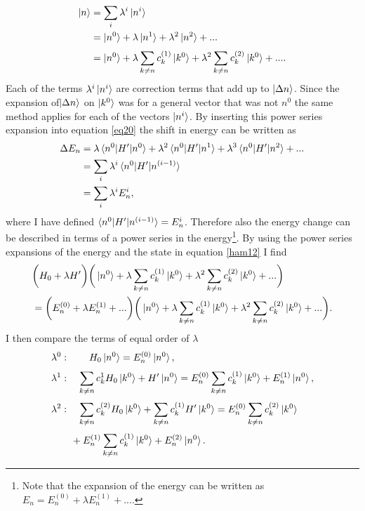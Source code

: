 \begin{equation}
	\begin{split}
		\ket{n}&=\sum_{i}\lambda^i\ket{n^i}\\
		&=\ket{n^0}+\lambda\ket{n^1}+\lambda^2\ket{n^2}+...\\
		&=\ket{n^0}+\lambda\sum_{k\neq n}^{}c_k^{(1)}\ket{k^0}+\lambda^2\sum_{k\neq n}^{}c_k^{(2)}\ket{k^0}+....
		\label{eig4}
	\end{split}
\end{equation} 
Each of the terms $\lambda^i\ket{n^i}$ are correction terms that add up to $\ket{\Delta n}$. Since the expansion of$\ket{\Delta n}$ on $\ket{k^0}$ was for a general vector that was not $n^0$ the same method applies for each of the vectors $\ket{n^i}$. 
By inserting this power series expansion into equation \eqref{eq20} the shift in energy can be written as
\begin{equation}
	\begin{split}
		\Delta E_n&=\lambda\braket{n^0|H'|n^0}+\lambda^2\braket{n^0|H'|n^1}+\lambda^3\braket{n^0|H'|n^2}+...\\
		&=\sum_{i}\lambda^i\braket{n^0|H'|n^{(i-1)}}\\
		&=\sum_{i}\lambda^iE_n^i,
	\end{split}
	\label{eq21}
\end{equation} 
where I have defined $\braket{n^0|H'|n^{(i-1)}}=E_n^i$. Therefore also the energy change can be described in terms of a power series in the energy\footnote{Note that the expansion of the energy can be written as $E_n=E_n^{(0)}+\lambda E_n^{(1)}+...$.}. By using the power series expansions of the energy and the state in equation \eqref{ham12} I find
\begin{equation}
	\begin{split}
		&\bigg(H_0+\lambda H'\bigg)\bigg(\ket{n^0}+\lambda\sum_{k\neq n}^{}c_k^{(1)}\ket{k^0}+\lambda^2\sum_{k\neq n}^{}c_k^{(2)}\ket{k^0}+...\bigg)\\&=\bigg(E_n^{(0)}+\lambda E_n^{(1)}+...\bigg)\bigg(\ket{n^0}+\lambda\sum_{k\neq n}^{}c_k^{(1)}\ket{k^0}+\lambda^2\sum_{k\neq n}^{}c_k^{(2)}\ket{k^0}+...\bigg).
	\end{split}
\end{equation} 
I then compare the terms of equal order of $\lambda$
\begin{equation}
	\begin{split}
		&\lambda^0:\qquad H_0\ket{n^0}=E_n^{(0)}\ket{n^0},\\
		&\lambda^1:\quad \sum_{k\neq n}^{}c_k^1H_0\ket{k^0}+H'\ket{n^0}=E_n^{(0)}\sum_{k\neq n}^{}c_k^{(1)}\ket{k^0}+E_n^{(1)}\ket{n^0},\\
		&\lambda^2:\quad \sum_{k\neq n}^{}c_k^{(2)}H_0\ket{k^0}+\sum_{k\neq n}^{}c_k^{(1)}H'\ket{k^0}=E_n^{(0)}\sum_{k\neq n}^{}c_k^{(2)}\ket{k^0}\\
		&\qquad+E_n^{(1)}\sum_{k\neq n}^{}c_k^{(1)}\ket{k^0}+E_n^{(2)}\ket{n^0}.
	\end{split}
	\label{eq22}
\end{equation} 
